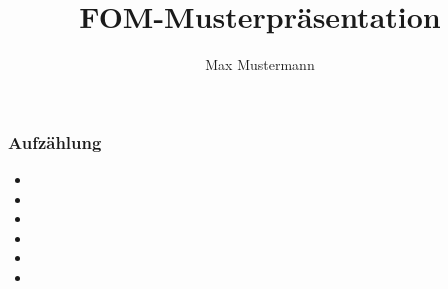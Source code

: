 \documentclass[12pt,ngerman]{beamer}
\author{Max Mustermann}
\title{FOM-Musterpräsentation}
\begin{document}
\begin{frame}

\maketitle

\end{frame}

\begin{frame}
\frametitle{Aufzählung}

\begin{itemize}
\item 
\item 
\item 
\item 
\item 
\item 
\end{itemize}

\end{frame}
\end{document}
